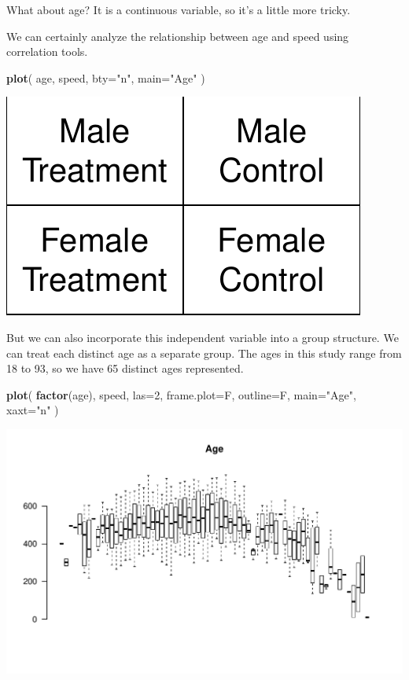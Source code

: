 \documentclass[]{book}
\newenvironment{Shaded}{\begin{snugshade}}{\end{snugshade}}
\newcommand{\DataTypeTok}[1]{\textcolor[rgb]{0.13,0.29,0.53}{#1}}
\newcommand{\DecValTok}[1]{\textcolor[rgb]{0.00,0.00,0.81}{#1}}
\newcommand{\KeywordTok}[1]{\textcolor[rgb]{0.13,0.29,0.53}{\textbf{#1}}}
\newcommand{\NormalTok}[1]{#1}
\newcommand{\StringTok}[1]{\textcolor[rgb]{0.31,0.60,0.02}{#1}}
\theoremstyle{definition}
\theoremstyle{definition}
\theoremstyle{definition}
\theoremstyle{remark}
\begin{document}
What about age? It is a continuous variable, so it's a little more
tricky.

We can certainly analyze the relationship between age and speed using
correlation tools.

\begin{Shaded}
\begin{Highlighting}[]
\KeywordTok{plot}\NormalTok{( age, speed, }\DataTypeTok{bty=}\StringTok{"n"}\NormalTok{, }\DataTypeTok{main=}\StringTok{"Age"}\NormalTok{ )}
\end{Highlighting}
\end{Shaded}

\begin{center}\includegraphics[width=0.7\linewidth]{DS4PS-I_files/figure-latex/unnamed-chunk-151-1} \end{center}

But we can also incorporate this independent variable into a group
structure. We can treat each distinct age as a separate group. The ages
in this study range from 18 to 93, so we have 65 distinct ages
represented.

\begin{Shaded}
\begin{Highlighting}[]

\KeywordTok{plot}\NormalTok{( }\KeywordTok{factor}\NormalTok{(age), speed, }\DataTypeTok{las=}\DecValTok{2}\NormalTok{, }\DataTypeTok{frame.plot=}\NormalTok{F, }\DataTypeTok{outline=}\NormalTok{F, }\DataTypeTok{main=}\StringTok{"Age"}\NormalTok{, }\DataTypeTok{xaxt=}\StringTok{"n"}\NormalTok{  )}
\end{Highlighting}
\end{Shaded}

\begin{center}\includegraphics[width=0.7\linewidth]{DS4PS-I_files/figure-latex/unnamed-chunk-152-1} \end{center}
\end{document}
